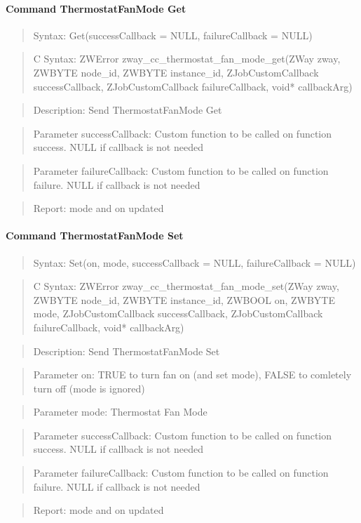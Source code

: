 \paragraph{Command ThermostatFanMode Get}
\begin{quote}Syntax: Get(successCallback = NULL, failureCallback = NULL)\end{quote}
\begin{quote}C Syntax: ZWError zway\_cc\_thermostat\_fan\_mode\_get(ZWay zway, ZWBYTE node\_id, ZWBYTE instance\_id, ZJobCustomCallback successCallback, ZJobCustomCallback failureCallback, void* callbackArg)\end{quote}
\begin{quote}Description: Send ThermostatFanMode Get\end{quote}
\begin{quote}Parameter successCallback: Custom function to be called on function success. NULL if callback is not needed\end{quote}
\begin{quote}Parameter failureCallback: Custom function to be called on function failure. NULL if callback is not needed\end{quote}
\begin{quote}Report: mode and on updated\end{quote}

\paragraph{Command ThermostatFanMode Set}
\begin{quote}Syntax: Set(on, mode, successCallback = NULL, failureCallback = NULL)\end{quote}
\begin{quote}C Syntax: ZWError zway\_cc\_thermostat\_fan\_mode\_set(ZWay zway, ZWBYTE node\_id, ZWBYTE instance\_id, ZWBOOL on, ZWBYTE mode, ZJobCustomCallback successCallback, ZJobCustomCallback failureCallback, void* callbackArg)\end{quote}
\begin{quote}Description: Send ThermostatFanMode Set\end{quote}
\begin{quote}Parameter on: TRUE to turn fan on (and set mode), FALSE to comletely turn off (mode is ignored)\end{quote}
\begin{quote}Parameter mode: Thermostat Fan Mode\end{quote}
\begin{quote}Parameter successCallback: Custom function to be called on function success. NULL if callback is not needed\end{quote}
\begin{quote}Parameter failureCallback: Custom function to be called on function failure. NULL if callback is not needed\end{quote}
\begin{quote}Report: mode and on updated\end{quote}


